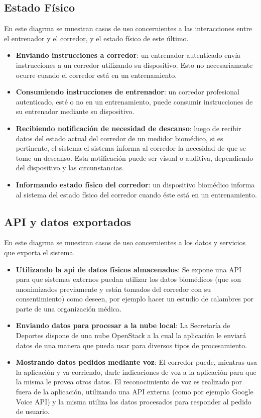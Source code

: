 \subsection{Estado Físico}
En este diagrma se muestran casos de uso concernientes a las interacciones entre el entrenador y el corredor, y el estado físico de este último.

\begin{itemize}
	\item \textbf{Enviando instrucciones a corredor}: un entrenador autenticado envía instrucciones a un corredor utilizando su dispositivo. Esto no necesariamente ocurre cuando el corredor está en un entrenamiento.
	\item \textbf{Consumiendo instrucciones de entrenador}: un corredor profesional autenticado, esté o no en un entrenamiento, puede consumir instrucciones de su entrenador mediante su dispositivo. 
	\item \textbf{Recibiendo notificación de necesidad de descanso}: luego de recibir datos del estado actual del corredor de un medidor biomédico, si es pertinente, el sistema el sistema informa al corredor la necesidad de que se tome un descanso. Esta notificación puede ser visual o auditiva, dependiendo del dispositivo y las circunstancias.
	\item \textbf{Informando estado físico del corredor}: un dispositivo biomédico informa al sistema del estado físico del corredor cuando éste está en un entrenamiento.
\end{itemize}


\subsection{API y datos exportados}
En este diagrma se muestran casos de uso concernientes a los datos y servicios que exporta el sistema.

\begin{itemize}
	\item \textbf{Utilizando la api de datos físicos almacenados}: Se expone una API para que sistemas externos puedan utilizar los datos biomédicos (que son anonimizados previamente y están tomados del corredor con su consentimiento) como deseen, por ejemplo hacer un estudio de calambres por parte de una organización médica. 
	\item \textbf{Enviando datos para procesar a la nube local}: La Secretaría de Deportes dispone de una nube OpenStack a la cual la aplicación le enviará datos de una manera que pueda usar para diversos tipos de procesamiento. 
	\item \textbf{Mostrando datos pedidos mediante voz}: El corredor puede, mientras usa la aplicación y va corriendo, darle indicaciones de voz a la aplicación para que la misma le provea otros datos. El reconocimiento de voz es realizado por fuera de la aplicación, utilizando una API externa (como por ejemplo Google Voice API) y la misma utiliza los datos procesados para responder al pedido de usuario.
\end{itemize}


